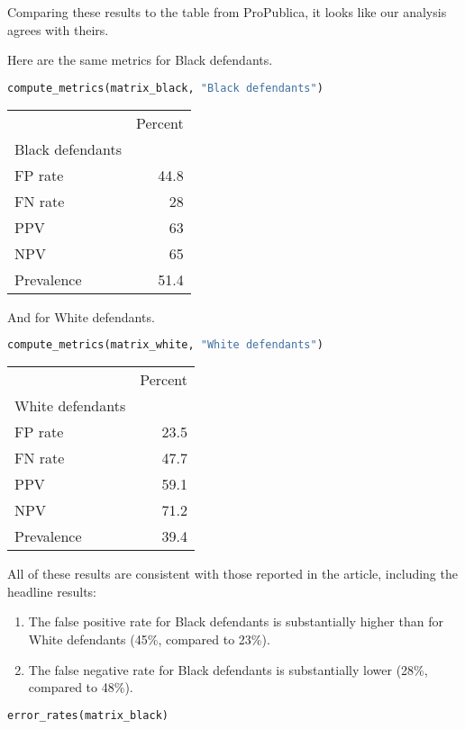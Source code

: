 Comparing these results to the table from ProPublica, it looks like our
analysis agrees with theirs.

Here are the same metrics for Black defendants.

\begin{lstlisting}[language=Python,style=source]
compute_metrics(matrix_black, "Black defendants")
\end{lstlisting}

\begin{tabular}{lr}
\midrule
 & Percent \\
Black defendants &  \\
\midrule
FP rate & 44.8 \\
FN rate & 28 \\
PPV & 63 \\
NPV & 65 \\
Prevalence & 51.4 \\
\midrule
\end{tabular}

And for White defendants.

\begin{lstlisting}[language=Python,style=source]
compute_metrics(matrix_white, "White defendants")
\end{lstlisting}

\begin{tabular}{lr}
\midrule
 & Percent \\
White defendants &  \\
\midrule
FP rate & 23.5 \\
FN rate & 47.7 \\
PPV & 59.1 \\
NPV & 71.2 \\
Prevalence & 39.4 \\
\midrule
\end{tabular}

All of these results are consistent with those reported in the article,
including the headline results:

\begin{enumerate}
\def\labelenumi{\arabic{enumi}.}
\item
  The false positive rate for Black defendants is substantially higher
  than for White defendants (45\%, compared to 23\%).
\item
  The false negative rate for Black defendants is substantially lower
  (28\%, compared to 48\%).
\end{enumerate}

\begin{lstlisting}[language=Python,style=source]
error_rates(matrix_black)
\end{lstlisting}

